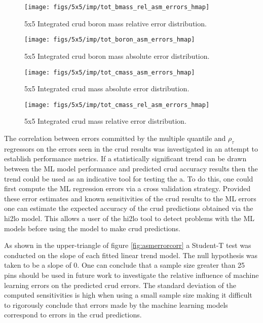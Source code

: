 \begin{figure}[H]
    \centering
    \texttt{[image: figs/5x5/imp/tot\_bmass\_rel\_asm\_errors\_hmap]}
    \caption{5x5 Integrated crud boron mass relative error distribution.}
    \label{fig:totbmassrelasmerrorshmap}
\end{figure}
\begin{figure}[H]
    \centering
    \texttt{[image: figs/5x5/imp/tot\_boron\_asm\_errors\_hmap]}
    \caption{5x5 Integrated crud boron mass absolute error distribution.}
    \label{fig:totboronasmerrorshmap}
\end{figure}
\begin{figure}[H]
    \centering
    \texttt{[image: figs/5x5/imp/tot\_cmass\_asm\_errors\_hmap]}
    \caption{5x5 Integrated crud mass absolute error distribution.}
    \label{fig:totcmassasmerrorshmap}
\end{figure}
\begin{figure}[H]
    \centering
    \texttt{[image: figs/5x5/imp/tot\_cmass\_rel\_asm\_errors\_hmap]}
    \caption{5x5 Integrated crud mass relative error distribution.}
    \label{fig:totcmassrelasmerrorshmap}
\end{figure}

The correlation between errors committed by the multiple quantile and $\rho_\tau$ regressors on the errors seen in the crud results was investigated in an attempt to establish performance metrics.  If a statistically significant trend can be drawn between the ML model performance and predicted crud accuracy results then the trend could be used as an indicative tool for testing the a.  To do this, one could first compute the ML regression errors via a cross validation strategy.  Provided these error estimates and known sensitivities of the crud results to the ML errors one can estimate the expected accuracy of the crud predictions obtained via the hi2lo model.  This allows a user of the hi2lo tool to detect problems with the ML models before using the model to make crud predictions.

As shown in the upper-triangle of figure \ref{fig:asmerrorcorr} a Student-T test was conducted on the slope of each fitted linear trend model.  The null hypothesis was taken to be a slope of 0.  One can conclude that a  sample size greater than 25 pins should be used in future work to investigate the relative influence of machine learning errors on the predicted crud errors.  The standard deviation of the computed sensitivities is high when using a small sample size making it difficult to rigorously conclude that errors made by the machine learning models correspond to errors in the crud predictions.

